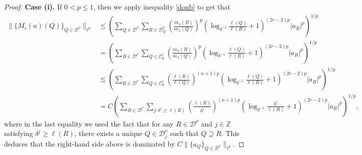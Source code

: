 \documentclass[12pt]{amsart}
\begin{document}
\begin{proof}
{\bf Case (i).} If $0<p\leq 1$, then we apply inequality \eqref{doub} to get that
\begin{align*}
\|\{M_r(a)(Q)\}_{Q\in\mathcal{D}^\nu}\|_{\ell^p}&\leq \left(\sum_{Q\in\mathcal{D}^\nu}\sum_{R\in\mathcal{D}_{Q}^\nu}\left(\frac{m_\lambda(R)}{m_\lambda(Q)}\right)^p\left(\log_{\delta^{-1}}\frac{\ell(Q)}{\ell(R)}+1\right)^{(2r-2)p}|a_R|^p\right)^{1/p}\\
&=\left(\sum_{R\in\mathcal{D}^\nu}\sum_{Q\in\mathcal{E}_{R}^\nu}\left(\frac{m_\lambda(R)}{m_\lambda(Q)}\right)^p\left(\log_{\delta^{-1}}\frac{\ell(Q)}{\ell(R)}+1\right)^{(2r-2)p}|a_R|^p\right)^{1/p}\\
&\lesssim\left(\sum_{R\in\mathcal{D}^\nu}\sum_{Q\in\mathcal{E}_{R}^\nu}\left(\frac{\ell(R)}{\ell(Q)}\right)^{(n+1)p}\left(\log_{\delta^{-1}}\frac{\ell(Q)}{\ell(R)}+1\right)^{(2r-2)p}|a_R|^p\right)^{1/p}\\
&=C\left(\sum_{R\in\mathcal{D}^\nu}\sum_{j:\delta^j\geq \ell(R)}\left(\frac{\ell(R)}{\delta^j}\right)^{(n+1)p}\left(\log_{\delta^{-1}}\frac{\delta^j}{\ell(R)}+1\right)^{(2r-2)p}|a_R|^p\right)^{1/p},
\end{align*}
where in the last equality we used the fact that for any $R\in\mathcal{D}^\nu$ and $j\in\mathbb{Z}$ satisfying $\delta^j\geq \ell(R)$, there exists a unique $Q\in\mathcal{D}_j^\nu$ such that $Q\supseteq R$. This deduces that the right-hand side above is dominated by $C\|\{a_Q\}_{Q\in\mathcal{D}^\nu}\|_{\ell^p}$.



\end{proof}
\end{document}
